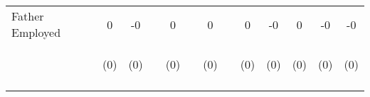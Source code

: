 \begin{tabular}{lcccccccccccc}
\noalign{\smallskip}Father Employed & 0 & -0 &  & 0 &  & 0 &  & 0 & -0 & 0 & -0 & -0\\
 & \begin{footnotesize}(0)\end{footnotesize} & \begin{footnotesize}(0)\end{footnotesize} & \begin{footnotesize}\end{footnotesize} & \begin{footnotesize}(0)\end{footnotesize} & \begin{footnotesize}\end{footnotesize} & \begin{footnotesize}(0)\end{footnotesize} & \begin{footnotesize}\end{footnotesize} & \begin{footnotesize}(0)\end{footnotesize} & \begin{footnotesize}(0)\end{footnotesize} & \begin{footnotesize}(0)\end{footnotesize} & \begin{footnotesize}(0)\end{footnotesize} & \begin{footnotesize}(0)\end{footnotesize}\\
\noalign{\smallskip}\hline\end{tabular}\\

